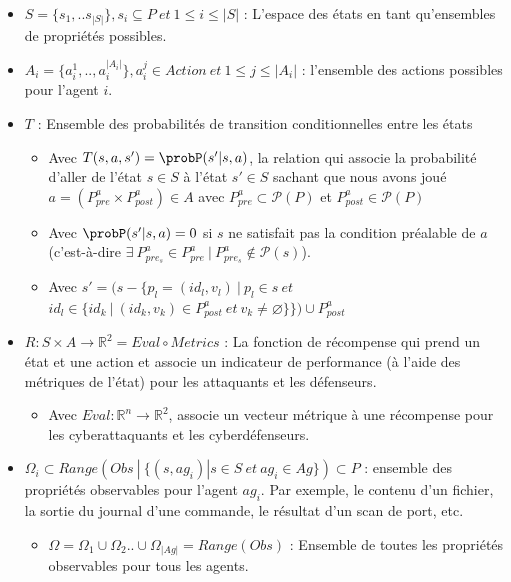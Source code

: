 \begin{itemize}
    \item $S = \{s_1, ..s_{|S|}\}, s_{i} \subseteq P \: et \: 1 \le i \le |S|$ : L'espace des états en tant qu'ensembles de propriétés possibles.

    \item $A_{i} = \{a_{i}^{1},..,a_{i}^{|A_{i}|}\}, a_{i}^j \in Action \: et \: 1 \le j \le |A_i|$ : l'ensemble des actions possibles pour l'agent $i$.

    \item $T$ : Ensemble des probabilités de transition conditionnelles entre les états
    \begin{itemize}
        \item Avec $T(s,a,s') = \probP(s'|s,a)$, la relation qui associe la probabilité d'aller de l'état $s \in S$ à l'état $s' \in S$ sachant que nous avons joué $a = (P^a_{pre} \times P^a_{post}) \in A$ avec $P^a_{pre} \subset \mathcal{P}(P)$ et $P^a_{post} \in \mathcal{P}(P)$
        \item Avec $\probP(s'|s,a) = 0$ si $s$ ne satisfait pas la condition préalable de $a$ (c'est-à-dire $\exists \: P_{pre_s}^{a} \in P_{pre}^{a} \: | \: P_{pre_s}^{a} \not\in \mathcal{P}(s)$).
        \item Avec $s' = (s - \{p_l=(id_l, v_l) \: | \: p_l \in s \: et$ $id_l \in \{id_k \: | \: (id_k, v_k) \in P^a_{post} \: et \: v_k \neq \varnothing\}\}) \cup P^a_{post}$
    \end{itemize}


    
    \item $R : S \times A \rightarrow \mathbb{R}^2 = Eval \circ Metrics$ : La fonction de récompense qui prend un état et une action et associe un indicateur de performance (à l'aide des métriques de l'état) pour les attaquants et les défenseurs.
    \begin{itemize}
        \item Avec $Eval : \mathbb{R}^{n} \rightarrow \mathbb{R}^2$, associe un vecteur métrique à une récompense pour les cyberattaquants et les cyberdéfenseurs.
    \end{itemize}


    
    \item $\Omega_{i} \subset Range(Obs \: | \: \{ (s, ag_i) | s \in S \: et \: ag_i \in Ag \}) \subset P$ : ensemble des propriétés observables pour l'agent $ag_i$. Par exemple, le contenu d'un fichier, la sortie du journal d'une commande, le résultat d'un scan de port, etc.
    \begin{itemize}
        \item $\Omega = \Omega_1 \cup \Omega_2 .. \cup \Omega_{|Ag|} = Range(Obs)$ : Ensemble de toutes les propriétés observables pour tous les agents.
    \end{itemize}


\end{itemize}
